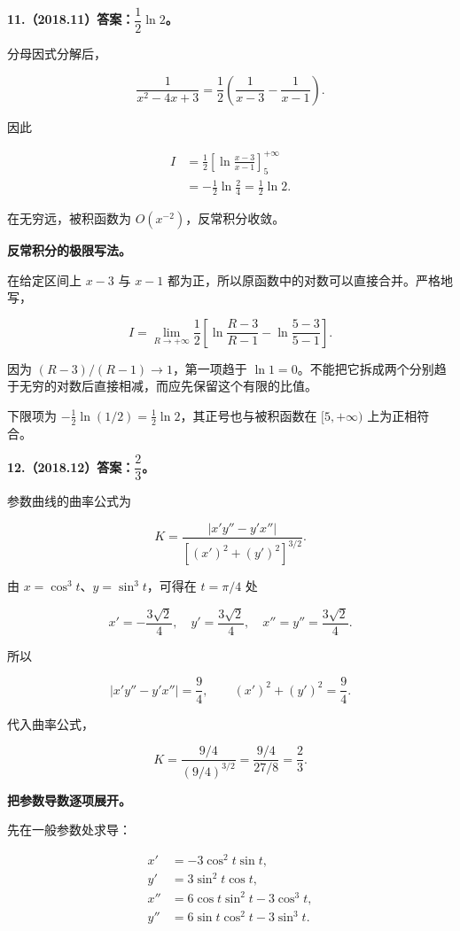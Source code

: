 \documentclass[UTF8,11pt,fontset=windows]{ctexart}
\begin{document}
\textbf{11.（2018.11）答案：$\dfrac12\ln2$。}

分母因式分解后，

$$
\frac1{x^2-4x+3}
=\frac12\left(\frac1{x-3}-\frac1{x-1}\right).
$$

因此

$$
\begin{aligned}
I&=\frac12\left[\ln\frac{x-3}{x-1}\right]_5^{+\infty}\\
&=-\frac12\ln\frac24
=\frac12\ln2.
\end{aligned}
$$

在无穷远，被积函数为 $O(x^{-2})$，反常积分收敛。

\textbf{反常积分的极限写法。}

在给定区间上 $x-3$ 与 $x-1$ 都为正，所以原函数中的对数可以直接合并。严格地写，

$$
I=\lim_{R\to+\infty}\frac12\left[\ln\frac{R-3}{R-1}-\ln\frac{5-3}{5-1}\right].
$$

因为 $(R-3)/(R-1)\to1$，第一项趋于 $\ln1=0$。不能把它拆成两个分别趋于无穷的对数后直接相减，而应先保留这个有限的比值。

下限项为 $-\tfrac12\ln(1/2)=\tfrac12\ln2$，其正号也与被积函数在 $[5,+\infty)$ 上为正相符合。

\clearpage

\textbf{12.（2018.12）答案：$\dfrac23$。}

参数曲线的曲率公式为

$$
K=\frac{|x'y''-y'x''|}{[(x')^2+(y')^2]^{3/2}}.
$$

由 $x=\cos^3t$、$y=\sin^3t$，可得在 $t=\pi/4$ 处

$$
x'=-\frac{3\sqrt2}{4},\quad y'=\frac{3\sqrt2}{4},\quad
x''=y''=\frac{3\sqrt2}{4}.
$$

所以

$$
|x'y''-y'x''|=\frac94,
\qquad (x')^2+(y')^2=\frac94.
$$

代入曲率公式，

$$
K=\frac{9/4}{(9/4)^{3/2}}=\frac{9/4}{27/8}=\frac23.
$$

\textbf{把参数导数逐项展开。}

先在一般参数处求导：

$$
\begin{aligned}
x'&=-3\cos^2t\sin t,\\
y'&=3\sin^2t\cos t,\\
x''&=6\cos t\sin^2t-3\cos^3t,\\
y''&=6\sin t\cos^2t-3\sin^3t.
\end{aligned}
$$
\end{document}
